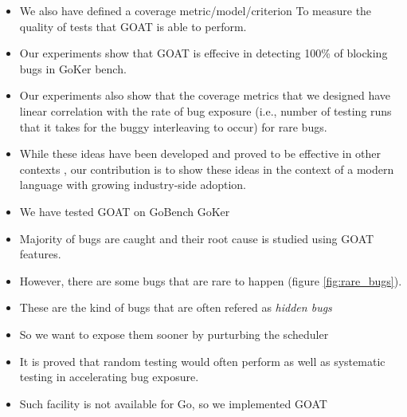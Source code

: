 
\begin{itemize}
  \item We also have defined a coverage metric/model/criterion To measure the quality of tests that GOAT is able to perform.
  \item Our experiments show that GOAT is effecive in detecting 100\% of blocking bugs in GoKer bench.
  \item Our experiments also show that the coverage metrics that we designed have linear correlation with the rate of bug exposure (i.e., number of testing runs that it takes for the buggy interleaving to occur) for rare bugs.
  \item While these ideas have been developed and proved to be effective in other contexts \cite{burckhardt-depthBug-asplos10,emmi-delayBounded-popl11,madanlal-preemptionBound-pldi07}, our contribution is to show these ideas in the context of a modern language with growing industry-side adoption.
\end{itemize}

\begin{itemize}
  \item We have tested GOAT on GoBench GoKer
  \item Majority of bugs are caught and their root cause is studied using GOAT features.
  \item However, there are some bugs that are rare to happen (figure \ref{fig:rare_bugs}).
  \item These are the kind of bugs that are often refered as \textit{hidden bugs}
  \item So we want to expose them sooner by purturbing the scheduler
  \item It is proved that random testing would often perform as well as systematic testing in accelerating bug exposure.
  \item Such facility is not available for Go, so we implemented GOAT
\end{itemize}
